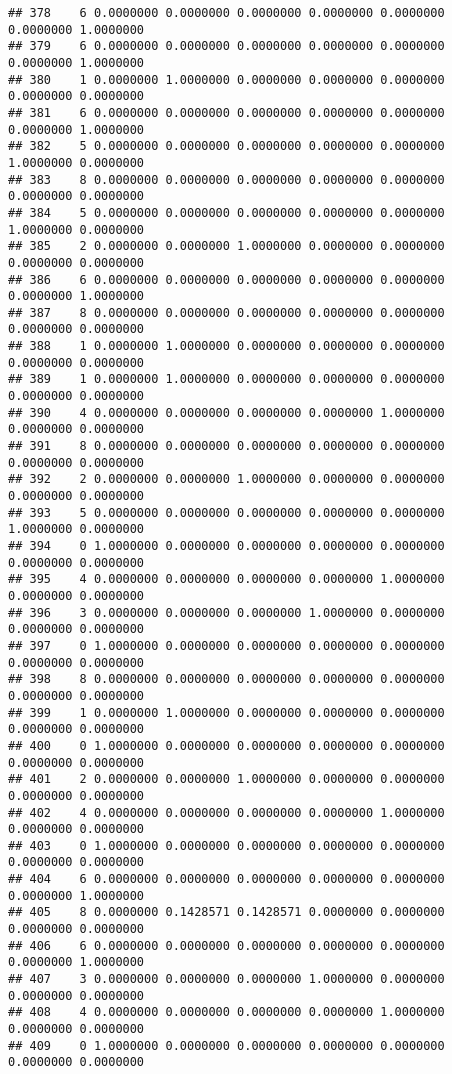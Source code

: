 \documentclass[
]{article}
\begin{document}
\begin{verbatim}
## 378    6 0.0000000 0.0000000 0.0000000 0.0000000 0.0000000 0.0000000 1.0000000
## 379    6 0.0000000 0.0000000 0.0000000 0.0000000 0.0000000 0.0000000 1.0000000
## 380    1 0.0000000 1.0000000 0.0000000 0.0000000 0.0000000 0.0000000 0.0000000
## 381    6 0.0000000 0.0000000 0.0000000 0.0000000 0.0000000 0.0000000 1.0000000
## 382    5 0.0000000 0.0000000 0.0000000 0.0000000 0.0000000 1.0000000 0.0000000
## 383    8 0.0000000 0.0000000 0.0000000 0.0000000 0.0000000 0.0000000 0.0000000
## 384    5 0.0000000 0.0000000 0.0000000 0.0000000 0.0000000 1.0000000 0.0000000
## 385    2 0.0000000 0.0000000 1.0000000 0.0000000 0.0000000 0.0000000 0.0000000
## 386    6 0.0000000 0.0000000 0.0000000 0.0000000 0.0000000 0.0000000 1.0000000
## 387    8 0.0000000 0.0000000 0.0000000 0.0000000 0.0000000 0.0000000 0.0000000
## 388    1 0.0000000 1.0000000 0.0000000 0.0000000 0.0000000 0.0000000 0.0000000
## 389    1 0.0000000 1.0000000 0.0000000 0.0000000 0.0000000 0.0000000 0.0000000
## 390    4 0.0000000 0.0000000 0.0000000 0.0000000 1.0000000 0.0000000 0.0000000
## 391    8 0.0000000 0.0000000 0.0000000 0.0000000 0.0000000 0.0000000 0.0000000
## 392    2 0.0000000 0.0000000 1.0000000 0.0000000 0.0000000 0.0000000 0.0000000
## 393    5 0.0000000 0.0000000 0.0000000 0.0000000 0.0000000 1.0000000 0.0000000
## 394    0 1.0000000 0.0000000 0.0000000 0.0000000 0.0000000 0.0000000 0.0000000
## 395    4 0.0000000 0.0000000 0.0000000 0.0000000 1.0000000 0.0000000 0.0000000
## 396    3 0.0000000 0.0000000 0.0000000 1.0000000 0.0000000 0.0000000 0.0000000
## 397    0 1.0000000 0.0000000 0.0000000 0.0000000 0.0000000 0.0000000 0.0000000
## 398    8 0.0000000 0.0000000 0.0000000 0.0000000 0.0000000 0.0000000 0.0000000
## 399    1 0.0000000 1.0000000 0.0000000 0.0000000 0.0000000 0.0000000 0.0000000
## 400    0 1.0000000 0.0000000 0.0000000 0.0000000 0.0000000 0.0000000 0.0000000
## 401    2 0.0000000 0.0000000 1.0000000 0.0000000 0.0000000 0.0000000 0.0000000
## 402    4 0.0000000 0.0000000 0.0000000 0.0000000 1.0000000 0.0000000 0.0000000
## 403    0 1.0000000 0.0000000 0.0000000 0.0000000 0.0000000 0.0000000 0.0000000
## 404    6 0.0000000 0.0000000 0.0000000 0.0000000 0.0000000 0.0000000 1.0000000
## 405    8 0.0000000 0.1428571 0.1428571 0.0000000 0.0000000 0.0000000 0.0000000
## 406    6 0.0000000 0.0000000 0.0000000 0.0000000 0.0000000 0.0000000 1.0000000
## 407    3 0.0000000 0.0000000 0.0000000 1.0000000 0.0000000 0.0000000 0.0000000
## 408    4 0.0000000 0.0000000 0.0000000 0.0000000 1.0000000 0.0000000 0.0000000
## 409    0 1.0000000 0.0000000 0.0000000 0.0000000 0.0000000 0.0000000 0.0000000

\end{verbatim}
\end{document}
